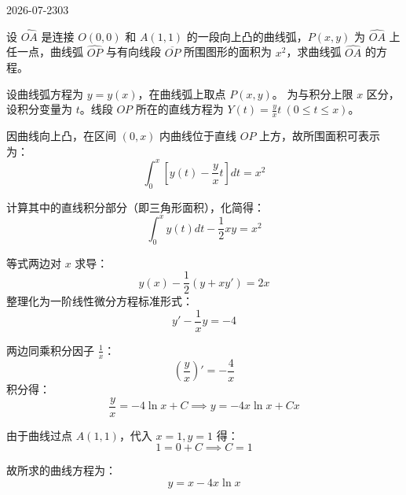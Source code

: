 \begin{mistake}{2026-07-23}{03}

\begin{problemcontent}
设 \(\widehat{OA}\) 是连接 \(O(0,0)\) 和 \(A(1,1)\) 的一段向上凸的曲线弧，\(P(x,y)\) 为 \(\widehat{OA}\) 上任一点，曲线弧 \(\widehat{OP}\) 与有向线段 \(\overline{OP}\) 所围图形的面积为 \(x^2\)，求曲线弧 \(\widehat{OA}\) 的方程。
\end{problemcontent}

\begin{solutioncontent}
设曲线弧方程为 \(y=y(x)\)，在曲线弧上取点 \(P(x,y)\)。
为与积分上限 \(x\) 区分，设积分变量为 \(t\)。线段 \(OP\) 所在的直线方程为 \(Y(t) = \frac{y}{x}t\ (0 \le t \le x)\)。

因曲线向上凸，在区间 \((0, x)\) 内曲线位于直线 \(OP\) 上方，故所围面积可表示为：
\[ \int_0^x \left[ y(t) - \frac{y}{x} t \right] dt = x^2 \]

计算其中的直线积分部分（即三角形面积），化简得：
\[ \int_0^x y(t) dt - \frac{1}{2}xy = x^2 \]

等式两边对 \(x\) 求导：
\[ y(x) - \frac{1}{2} \left( y + x y' \right) = 2x \]
整理化为一阶线性微分方程标准形式：
\[ y' - \frac{1}{x} y = -4 \]

两边同乘积分因子 \(\frac{1}{x}\)：
\[ \left( \frac{y}{x} \right)' = -\frac{4}{x} \]
积分得：
\[ \frac{y}{x} = -4 \ln x + C \implies y = -4x \ln x + Cx \]

由于曲线过点 \(A(1,1)\)，代入 \(x=1, y=1\) 得：
\[ 1 = 0 + C \implies C = 1 \]

故所求的曲线方程为：
\[ y = x - 4x \ln x \]
\end{solutioncontent}


\end{mistake}
